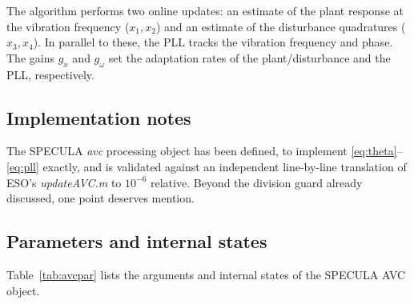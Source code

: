 \documentclass[11pt]{article}
\begin{document}
The algorithm performs two online updates: an estimate of the plant response at the vibration frequency ($x_1,x_2$) and an estimate of the disturbance quadratures ($x_3,x_4$).
%
In parallel to these, the PLL tracks the vibration frequency and phase.
%
The gains $g_x$ and $g_\omega$ set the adaptation rates of the plant/disturbance and the PLL, respectively.

\subsection{Implementation notes}

The SPECULA \textit{avc} processing object has been defined, to implement \eqref{eq:theta}--\eqref{eq:pll} exactly, and is validated against an independent line-by-line translation of ESO's \textit{updateAVC.m} to $10^{-6}$ relative.
%
Beyond the division guard already discussed, one point deserves mention.

%

\subsection{Parameters and internal states}
\label{sec:params}

Table~\ref{tab:avcpar} lists the arguments and internal states of the SPECULA AVC object.
\end{document}
